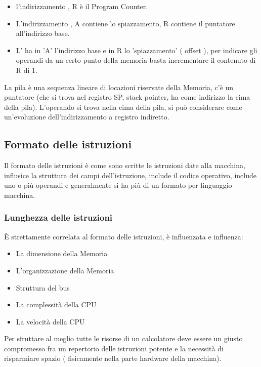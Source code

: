 \documentclass[arch.tex]{subfiles}
\begin{document}
\begin{itemize}
	\item l'indirizzamento , R è il Program Counter.
	\item L'indirizzamento , A contiene lo spiazzamento, 
		R contiene il puntatore all'indirizzo base.
	\item L' ha in 'A' l'indirizzo base e in R lo 'spiazzamento' 
		( offset ), per indicare gli operandi da un certo punto della memoria 
		basta incrementare il contenuto di R di 1.
\end{itemize}
%
\label{sub:stack_pila}
La pila è una sequenza lineare di locazioni riservate della Memoria, c'è un puntatore (che si 
trova nel registro SP, stack pointer, ha come indirizzo la cima della pila). L'operando
si trova nella cima della pila, si può considerare come un'evoluzione dell'indirizzamento a
registro indiretto.
\subsection{Formato delle istruzioni}%
\label{sub:formato_delle_istruzioni}
Il formato delle istruzioni è come sono scritte le istruzioni date alla macchina, influsice
la struttura dei campi dell'istruzione, include il codice operativo, include uno o più operandi
e generalmente si ha più di un formato per linguaggio macchina.

\subsubsection{Lunghezza delle istruzioni}
È strettamente correlata al formato delle istruzioni, è influenzata e influenza:

\begin{itemize}
	\item La dimensione della Memoria
	\item L'organizzazione della Memoria
	\item Struttura del bus
	\item La complessità della CPU
	\item La velocità della CPU
\end{itemize}
Per sfruttare al meglio tutte le risorse di un calcolatore deve essere un giusto compromesso
fra un repertorio delle istruzioni potente e la necessità di risparmiare spazio ( fisicamente
nella parte hardware della macchina).

%
\label{ppar:Tipi di formati delle istruzioni}
\end{document}
